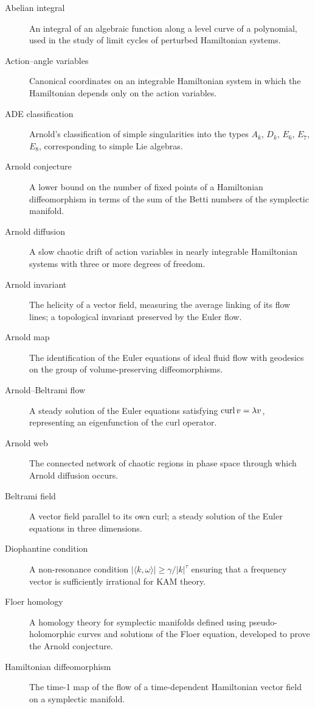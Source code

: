 \begin{description}
    \item[Abelian integral] An integral of an algebraic function along a level curve of a polynomial, used in the study of limit cycles of perturbed Hamiltonian systems.
    \item[Action--angle variables] Canonical coordinates on an integrable Hamiltonian system in which the Hamiltonian depends only on the action variables.
    \item[ADE classification] Arnold's classification of simple singularities into the types \(A_k\), \(D_k\), \(E_6\), \(E_7\), \(E_8\), corresponding to simple Lie algebras.
    \item[Arnold conjecture] A lower bound on the number of fixed points of a Hamiltonian diffeomorphism in terms of the sum of the Betti numbers of the symplectic manifold.
    \item[Arnold diffusion] A slow chaotic drift of action variables in nearly integrable Hamiltonian systems with three or more degrees of freedom.
    \item[Arnold invariant] The helicity of a vector field, measuring the average linking of its flow lines; a topological invariant preserved by the Euler flow.
    \item[Arnold map] The identification of the Euler equations of ideal fluid flow with geodesics on the group of volume-preserving diffeomorphisms.
    \item[Arnold--Beltrami flow] A steady solution of the Euler equations satisfying \(\operatorname{curl} v = \lambda v\), representing an eigenfunction of the curl operator.
    \item[Arnold web] The connected network of chaotic regions in phase space through which Arnold diffusion occurs.
    \item[Beltrami field] A vector field parallel to its own curl; a steady solution of the Euler equations in three dimensions.
    \item[Diophantine condition] A non-resonance condition \(|\langle k,\omega\rangle| \geq \gamma/|k|^\tau\) ensuring that a frequency vector is sufficiently irrational for KAM theory.
    \item[Floer homology] A homology theory for symplectic manifolds defined using pseudo-holomorphic curves and solutions of the Floer equation, developed to prove the Arnold conjecture.
    \item[Hamiltonian diffeomorphism] The time-1 map of the flow of a time-dependent Hamiltonian vector field on a symplectic manifold.

\end{description}
